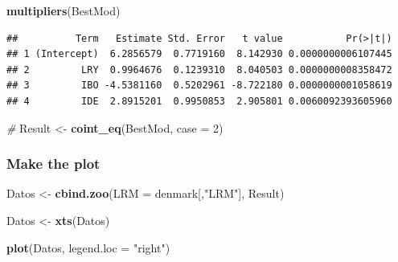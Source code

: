 \documentclass[
]{book}
\newenvironment{Shaded}{\begin{snugshade}}{\end{snugshade}}
\newcommand{\AttributeTok}[1]{\textcolor[rgb]{0.13,0.29,0.53}{#1}}
\newcommand{\CommentTok}[1]{\textcolor[rgb]{0.56,0.35,0.01}{\textit{#1}}}
\newcommand{\DecValTok}[1]{\textcolor[rgb]{0.00,0.00,0.81}{#1}}
\newcommand{\FunctionTok}[1]{\textcolor[rgb]{0.13,0.29,0.53}{\textbf{#1}}}
\newcommand{\NormalTok}[1]{#1}
\newcommand{\OtherTok}[1]{\textcolor[rgb]{0.56,0.35,0.01}{#1}}
\newcommand{\StringTok}[1]{\textcolor[rgb]{0.31,0.60,0.02}{#1}}
\begin{document}
\begin{Shaded}
\begin{Highlighting}[]
\FunctionTok{multipliers}\NormalTok{(BestMod)}
\end{Highlighting}
\end{Shaded}

\begin{verbatim}
##          Term   Estimate Std. Error   t value           Pr(>|t|)
## 1 (Intercept)  6.2856579  0.7719160  8.142930 0.0000000006107445
## 2         LRY  0.9964676  0.1239310  8.040503 0.0000000008358472
## 3         IBO -4.5381160  0.5202961 -8.722180 0.0000000001058619
## 4         IDE  2.8915201  0.9950853  2.905801 0.0060092393605960
\end{verbatim}

\begin{Shaded}
\begin{Highlighting}[]
\CommentTok{\#}
\NormalTok{Result }\OtherTok{\textless{}{-}} \FunctionTok{coint\_eq}\NormalTok{(BestMod, }\AttributeTok{case =} \DecValTok{2}\NormalTok{)}
\end{Highlighting}
\end{Shaded}

\hypertarget{make-the-plot}{%
\subsubsection{Make the plot}\label{make-the-plot}}

\begin{Shaded}
\begin{Highlighting}[]
\NormalTok{Datos }\OtherTok{\textless{}{-}} \FunctionTok{cbind.zoo}\NormalTok{(}\AttributeTok{LRM =}\NormalTok{ denmark[,}\StringTok{"LRM"}\NormalTok{], Result)}

\NormalTok{Datos }\OtherTok{\textless{}{-}} \FunctionTok{xts}\NormalTok{(Datos)}

\FunctionTok{plot}\NormalTok{(Datos, }\AttributeTok{legend.loc =} \StringTok{"right"}\NormalTok{)}
\end{Highlighting}
\end{Shaded}
\end{document}
